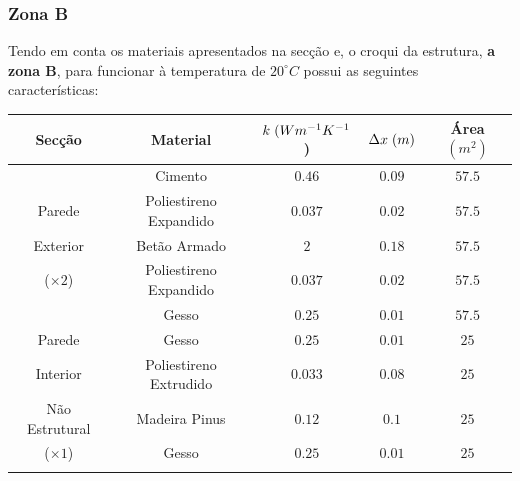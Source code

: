 \documentclass[12pt, a4paper]{article}
\begin{document}
\pagebreak
\subsubsection{Zona B}\label{ssub:zonab}

Tendo em conta os materiais apresentados na secção e, o croqui da estrutura, \textbf{a zona B}, para funcionar
à temperatura de $ 20^\circ C $ possui as seguintes características:

\begin{table}[htpb]
	\begin{center}
		\begin{tabular}{c c c c c}
			\toprule{}
			Secção                     & Material               & $ k \hspace{1mm} (Wm^{-1}K^{-1}$) & $ \Delta x \hspace{1mm} (m)$ & Área $(m^2) $ \\
				\midrule{}

			\multirow{5}{*}{}          & Cimento                & $0.46$                            & $0.09$                       & $57.5$          \\
				\cline{2-5}
			Parede                     & Poliestireno Expandido & $0.037$                           & $0.02$                       & $57.5$          \\
				\cline{2-5}
			Exterior                   & Betão Armado           & $2$                               & $0.18$                       & $57.5$          \\
				\cline{2-5}
			($\times 2$)               & Poliestireno Expandido & $0.037$                           & $0.02$                       & $57.5$          \\
				\cline{2-5}
			                           & Gesso                  & $0.25$                            & $0.01$                       & $57.5$          \\
				\midrule{}

			Parede \multirow{4}{*}{}   & Gesso                  & $0.25$                            & $0.01$                       & $25$          \\
				\cline{2-5}
			Interior                   & Poliestireno Extrudido & $0.033$                           & $0.08$                       & $25$          \\
				\cline{2-5}
			Não Estrutural             & Madeira Pinus          & $0.12$                            & $0.1$                        & $25$          \\
				\cline{2-5}
			($\times 1$)               & Gesso                  & $0.25$                            & $0.01$                       & $25$          \\
				\midrule{}


\end{tabular}
\end{center}
\end{table}
\end{document}
